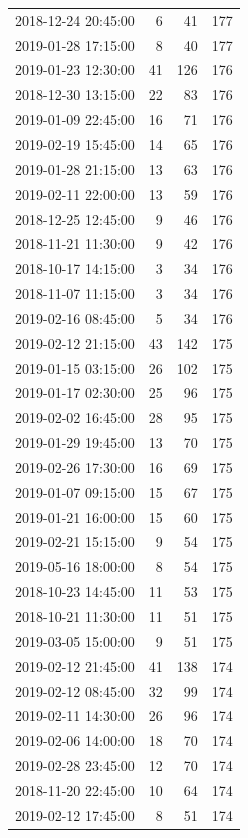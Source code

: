 \begin{tabular}{lrrr}
2018-12-24 20:45:00 & 6 & 41 & 177 \\
2019-01-28 17:15:00 & 8 & 40 & 177 \\
2019-01-23 12:30:00 & 41 & 126 & 176 \\
2018-12-30 13:15:00 & 22 & 83 & 176 \\
2019-01-09 22:45:00 & 16 & 71 & 176 \\
2019-02-19 15:45:00 & 14 & 65 & 176 \\
2019-01-28 21:15:00 & 13 & 63 & 176 \\
2019-02-11 22:00:00 & 13 & 59 & 176 \\
2018-12-25 12:45:00 & 9 & 46 & 176 \\
2018-11-21 11:30:00 & 9 & 42 & 176 \\
2018-10-17 14:15:00 & 3 & 34 & 176 \\
2018-11-07 11:15:00 & 3 & 34 & 176 \\
2019-02-16 08:45:00 & 5 & 34 & 176 \\
2019-02-12 21:15:00 & 43 & 142 & 175 \\
2019-01-15 03:15:00 & 26 & 102 & 175 \\
2019-01-17 02:30:00 & 25 & 96 & 175 \\
2019-02-02 16:45:00 & 28 & 95 & 175 \\
2019-01-29 19:45:00 & 13 & 70 & 175 \\
2019-02-26 17:30:00 & 16 & 69 & 175 \\
2019-01-07 09:15:00 & 15 & 67 & 175 \\
2019-01-21 16:00:00 & 15 & 60 & 175 \\
2019-02-21 15:15:00 & 9 & 54 & 175 \\
2019-05-16 18:00:00 & 8 & 54 & 175 \\
2018-10-23 14:45:00 & 11 & 53 & 175 \\
2018-10-21 11:30:00 & 11 & 51 & 175 \\
2019-03-05 15:00:00 & 9 & 51 & 175 \\
2019-02-12 21:45:00 & 41 & 138 & 174 \\
2019-02-12 08:45:00 & 32 & 99 & 174 \\
2019-02-11 14:30:00 & 26 & 96 & 174 \\
2019-02-06 14:00:00 & 18 & 70 & 174 \\
2019-02-28 23:45:00 & 12 & 70 & 174 \\
2018-11-20 22:45:00 & 10 & 64 & 174 \\
2019-02-12 17:45:00 & 8 & 51 & 174 \\

\end{tabular}
